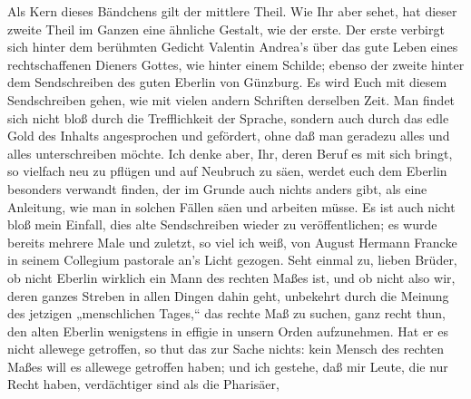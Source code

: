 Als Kern dieses Bändchens gilt der mittlere Theil. Wie Ihr aber sehet, hat dieser zweite Theil im Ganzen eine ähnliche Gestalt, wie der erste. Der erste verbirgt sich hinter dem berühmten Gedicht Valentin Andrea’s über das gute Leben eines rechtschaffenen Dieners Gottes, wie hinter einem Schilde; ebenso der zweite hinter dem Sendschreiben des guten Eberlin von Günzburg. Es wird Euch mit diesem Sendschreiben gehen, wie mit vielen andern Schriften derselben Zeit. Man findet sich nicht bloß durch die Trefflichkeit der Sprache, sondern auch durch das edle Gold des Inhalts angesprochen und gefördert, ohne daß man geradezu alles und alles unterschreiben möchte. Ich denke aber, Ihr, deren Beruf es mit sich bringt, so vielfach neu zu pflügen und auf Neubruch zu säen, werdet euch dem Eberlin besonders verwandt finden, der im Grunde auch nichts anders gibt, als eine Anleitung, wie man in solchen Fällen säen und arbeiten müsse. Es ist auch nicht bloß mein Einfall, dies alte Sendschreiben wieder zu veröffentlichen; es wurde bereits mehrere Male und zuletzt, so viel ich weiß, von August Hermann Francke in seinem Collegium pastorale an’s Licht gezogen. Seht einmal zu, lieben Brüder, ob nicht Eberlin wirklich ein Mann des rechten Maßes ist, und ob nicht also wir, deren ganzes Streben in allen Dingen dahin geht, unbekehrt durch die Meinung des jetzigen „menschlichen Tages,“ das rechte Maß zu suchen, ganz recht thun, den alten Eberlin wenigstens in effigie in unsern Orden aufzunehmen. Hat er es nicht allewege getroffen, so thut das zur Sache nichts: kein Mensch des rechten Maßes will es allewege getroffen haben; und ich gestehe, daß mir Leute, die nur Recht haben, verdächtiger sind als die Pharisäer,

